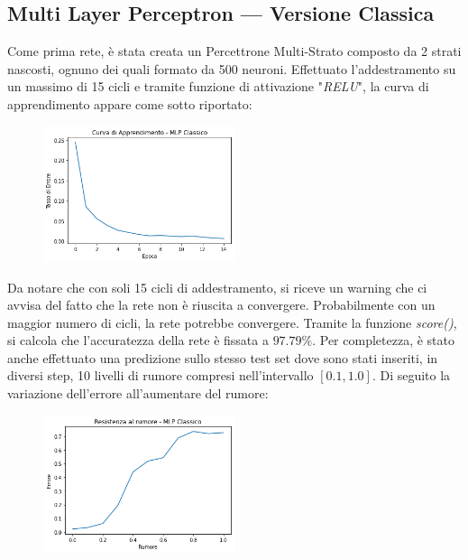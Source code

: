 \documentclass[12pt, a4paper]{article}
\begin{document}
\subsection{Multi Layer Perceptron --- Versione Classica}
Come prima rete, è stata creata un Percettrone Multi-Strato composto da 2 strati nascosti, ognuno dei quali formato da 500 neuroni. Effettuato l'addestramento su un massimo di 15 cicli e tramite funzione di attivazione "\textit{RELU}", la curva di apprendimento appare come sotto riportato:
\begin{figure}[H]
    \centering
    \includegraphics[width=0.50\textwidth]{Curva_MLP}
\end{figure}
Da notare che con soli 15 cicli di addestramento, si riceve un warning che ci avvisa del fatto che la rete non è riuscita a convergere. Probabilmente con un maggior numero di cicli, la rete potrebbe convergere.
Tramite la funzione \textit{score()}, si calcola che l'accuratezza della rete è fissata a \(97.79\%\).
Per completezza, è stato anche effettuato una predizione sullo stesso test set dove sono stati inseriti, in diversi step, 10 livelli di rumore compresi nell'intervallo \([0.1 , 1.0]\). Di seguito la variazione dell'errore all'aumentare del rumore:
\begin{figure}[H]
    \centering
    \includegraphics[width=0.50\textwidth]{Rumore_MLP.png}
\end{figure}
\end{document}
